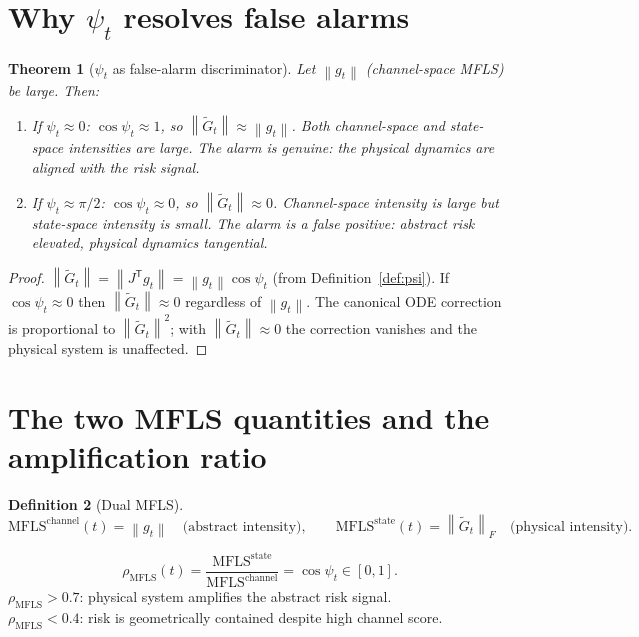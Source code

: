 \documentclass[11pt,a4paper,openany]{book}
\newtheorem{theorem}{Theorem}[chapter]
\theoremstyle{definition}
\newtheorem{definition}[theorem]{Definition}
\newcommand{\T}{^{\mathsf{T}}}
\newcommand{\norm}[1]{\left\|#1\right\|}
\newcommand{\mfls}{\mathrm{MFLS}}
\begin{document}
\section{Why $\psi_t$ resolves false alarms}

\begin{theorem}[$\psi_t$ as false-alarm discriminator]
Let $\norm{g_t}$ (channel-space MFLS) be large. Then:
\begin{enumerate}[label=(\roman*)]
\item If $\psi_t \approx 0$: $\cos\psi_t \approx 1$, so $\norm{\tilde G_t} \approx \norm{g_t}$.
  Both channel-space and state-space intensities are large.
  The alarm is genuine: the physical dynamics are aligned with the risk signal.
\item If $\psi_t \approx \pi/2$: $\cos\psi_t \approx 0$, so $\norm{\tilde G_t} \approx 0$.
  Channel-space intensity is large but state-space intensity is small.
  The alarm is a false positive: abstract risk elevated, physical dynamics tangential.
\end{enumerate}
\end{theorem}

\begin{proof}
$\norm{\tilde G_t} = \norm{J\T g_t} = \norm{g_t}\cos\psi_t$ (from Definition~\ref{def:psi}).
If $\cos\psi_t \approx 0$ then $\norm{\tilde G_t} \approx 0$ regardless of $\norm{g_t}$.
The canonical ODE correction is proportional to $\norm{\tilde G_t}^2$; with $\norm{\tilde G_t} \approx 0$
the correction vanishes and the physical system is unaffected.
\end{proof}

\section{The two MFLS quantities and the amplification ratio}

\begin{definition}[Dual MFLS]
\[
\mfls^\mathrm{channel}(t) = \norm{g_t} \quad\text{(abstract intensity)},
\qquad
\mfls^\mathrm{state}(t) = \norm{\tilde G_t}_F \quad\text{(physical intensity)}.
\]
\end{definition}

\begin{lockedbox}
\[
\rho_\mfls(t) = \frac{\mfls^\mathrm{state}}{\mfls^\mathrm{channel}} = \cos\psi_t \in [0,1].
\]
$\rho_\mfls > 0.7$: physical system amplifies the abstract risk signal.\\
$\rho_\mfls < 0.4$: risk is geometrically contained despite high channel score.
\end{lockedbox}
\end{document}
